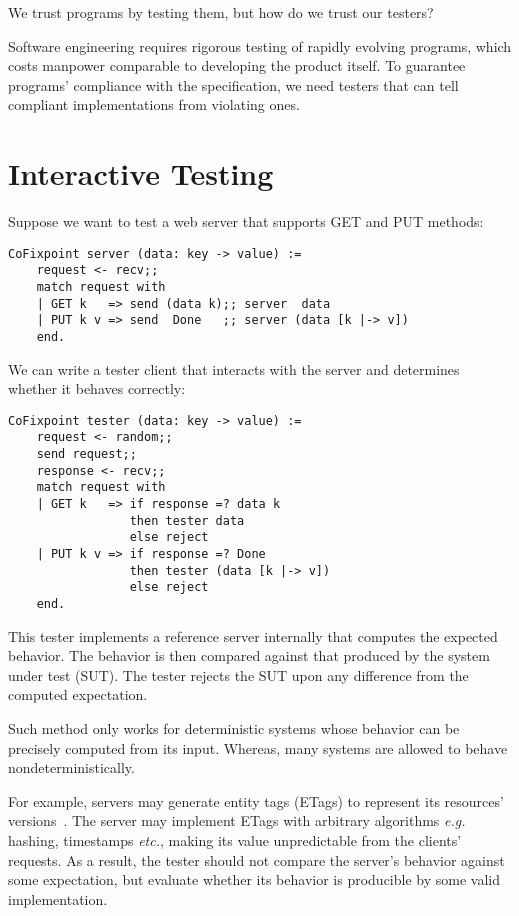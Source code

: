 We trust programs by testing them, but how do we trust our testers?

Software engineering requires rigorous testing of rapidly evolving programs,
which costs manpower comparable to developing the product itself.  To guarantee
programs' compliance with the specification, we need testers that can tell
compliant implementations from violating ones.

\section{Interactive Testing}
Suppose we want to test a web server that supports GET and PUT methods:
\begin{lstlisting}[style=customcoq]
  CoFixpoint server (data: key -> value) :=
    request <- recv;;
    match request with
    | GET k   => send (data k);; server  data
    | PUT k v => send  Done   ;; server (data [k |-> v])
    end.
\end{lstlisting}
We can write a tester client that interacts with the server and determines
whether it behaves correctly:
\begin{lstlisting}[style=customcoq]
  CoFixpoint tester (data: key -> value) :=
    request <- random;;
    send request;;
    response <- recv;;
    match request with
    | GET k   => if response =? data k
                 then tester data
                 else reject
    | PUT k v => if response =? Done
                 then tester (data [k |-> v])
                 else reject
    end.
\end{lstlisting}
This tester implements a reference server internally that computes the expected
behavior.  The behavior is then compared against that produced by the system
under test (SUT).  The tester rejects the SUT upon any difference from the
computed expectation.

Such method only works for deterministic systems whose behavior can be precisely
computed from its input.  Whereas, many systems are allowed to behave
nondeterministically.

For example, \http servers may generate entity tags (ETags) to represent its
resources' versions~\cite{rfc7232}.  The server may implement ETags with
arbitrary algorithms {\it e.g.} hashing, timestamps {\it etc.}, making its value
unpredictable from the clients' requests.  As a result, the tester should not
compare the server's behavior against some expectation, but evaluate whether its
behavior is producible by some valid implementation.

